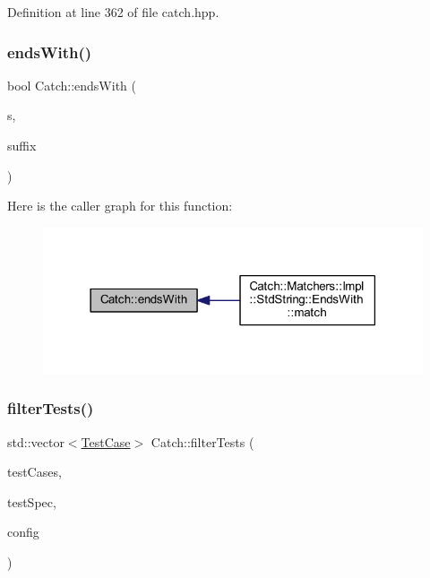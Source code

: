 Definition at line 362 of file catch.\+hpp.

\hypertarget{namespace_catch_ada025504f627feaf9ac68ca391515dff}{}\label{namespace_catch_ada025504f627feaf9ac68ca391515dff} 
\subsubsection{\texorpdfstring{ends\+With()}{endsWith()}}
{\footnotesize\ttfamily bool Catch\+::ends\+With (\begin{DoxyParamCaption}\item[{std\+::string const \&}]{s,  }\item[{std\+::string const \&}]{suffix }\end{DoxyParamCaption})}

Here is the caller graph for this function\+:\nopagebreak
\begin{figure}[H]
\begin{center}
\leavevmode
\includegraphics[width=318pt]{namespace_catch_ada025504f627feaf9ac68ca391515dff_icgraph}
\end{center}
\end{figure}
\hypertarget{namespace_catch_ab5da9aa67c42a3f626aea07d0b556829}{}\label{namespace_catch_ab5da9aa67c42a3f626aea07d0b556829} 
\subsubsection{\texorpdfstring{filter\+Tests()}{filterTests()}}
{\footnotesize\ttfamily std\+::vector$<$\hyperlink{class_catch_1_1_test_case}{Test\+Case}$>$ Catch\+::filter\+Tests (\begin{DoxyParamCaption}\item[{std\+::vector$<$ \hyperlink{class_catch_1_1_test_case}{Test\+Case} $>$ const \&}]{test\+Cases,  }\item[{Test\+Spec const \&}]{test\+Spec,  }\item[{I\+Config const \&}]{config }\end{DoxyParamCaption})}


